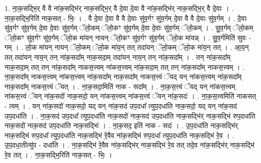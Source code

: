 \documentclass[17pt]{extarticle}
\begin{document}
1. ना॒क॒सद्भि॒र् वै वै ना॑क॒सद्भि॑र् नाक॒सद्भि॒र् वै दे॒वा दे॒वा वै ना॑क॒सद्भि॑र् नाक॒सद्भि॒र् वै दे॒वाः । . ना॒क॒सद्भि॒रिति॑ नाक॒सत् - भिः॒ । . वै दे॒वा दे॒वा वै वै दे॒वाः सु॑व॒र्गꣳ सु॑व॒र्गम् दे॒वा वै वै दे॒वाः सु॑व॒र्गम् । . दे॒वाः सु॑व॒र्गꣳ सु॑व॒र्गम् दे॒वा दे॒वाः सु॑व॒र्गम् ॅलो॒कम् ॅलो॒कꣳ सु॑व॒र्गम् दे॒वा दे॒वाः सु॑व॒र्गम् ॅलो॒कम् । . सु॒व॒र्गम् ॅलो॒कम् ॅलो॒कꣳ सु॑व॒र्गꣳ सु॑व॒र्गम् ॅलो॒क मा॑यन् नायन् ॅलो॒कꣳ सु॑व॒र्गꣳ सु॑व॒र्गम् ॅलो॒क मा॑यन्न् । . सु॒व॒र्गमिति॑ सुवः - गम् । . लो॒क मा॑यन् नायन् ॅलो॒कम् ॅलो॒क मा॑य॒न् तत् तदा॑यन् ॅलो॒कम् ॅलो॒क मा॑य॒न् तत् । . आ॒य॒न् तत् तदा॑यन् नाय॒न् तन् ना॑क॒सदा᳚म् नाक॒सदा॒म् तदा॑यन् नाय॒न् तन् ना॑क॒सदा᳚म् । . तन् ना॑क॒सदा᳚म् नाक॒सदा॒म् तत् तन् ना॑क॒सदा᳚म् नाकस॒त्त्वम् ना॑कस॒त्त्वम् ना॑क॒सदा॒म् तत् तन् ना॑क॒सदा᳚म् नाकस॒त्त्वम् । . ना॒क॒सदा᳚म् नाकस॒त्त्वम् ना॑कस॒त्त्वम् ना॑क॒सदा᳚म् नाक॒सदा᳚म् नाकस॒त्त्वं ॅयद् यन् ना॑कस॒त्त्वम् ना॑क॒सदा᳚म् नाक॒सदा᳚म् नाकस॒त्त्वं ॅयत् । . ना॒क॒सदा॒मिति॑ नाक - सदा᳚म् । . ना॒क॒स॒त्त्वं ॅयद् यन् ना॑कस॒त्त्वम् ना॑कस॒त्त्वं ॅयन् ना॑क॒सदो॑ नाक॒सदो॒ यन् ना॑कस॒त्त्वम् ना॑कस॒त्त्वं ॅयन् ना॑क॒सदः॑ । . ना॒क॒स॒त्त्वमिति॑ नाकसत् - त्वम् । . यन् ना॑क॒सदो॑ नाक॒सदो॒ यद् यन् ना॑क॒सद॑ उप॒दधा᳚ त्युप॒दधा॑ति नाक॒सदो॒ यद् यन् ना॑क॒सद॑ उप॒दधा॑ति । . ना॒क॒सद॑ उप॒दधा᳚ त्युप॒दधा॑ति नाक॒सदो॑ नाक॒सद॑ उप॒दधा॑ति नाक॒सद्भि॑र् नाक॒सद्भि॑ रुप॒दधा॑ति नाक॒सदो॑ नाक॒सद॑ उप॒दधा॑ति नाक॒सद्भिः॑ । . ना॒क॒सद॒ इति॑ नाक - सदः॑ । . उ॒प॒दधा॑ति नाक॒सद्भि॑र् नाक॒सद्भि॑ रुप॒दधा᳚ त्युप॒दधा॑ति नाक॒सद्भि॑ रे॒वैव ना॑क॒सद्भि॑ रुप॒दधा᳚ त्युप॒दधा॑ति नाक॒सद्भि॑ रे॒व । . उ॒प॒दधा॒तीत्यु॑प - दधा॑ति । . ना॒क॒सद्भि॑ रे॒वैव ना॑क॒सद्भि॑र् नाक॒सद्भि॑ रे॒व तत् तदे॒व ना॑क॒सद्भि॑र् नाक॒सद्भि॑ रे॒व तत् । . ना॒क॒सद्भि॒रिति॑ नाक॒सत् - भिः॒ । \newline
\end{document}
